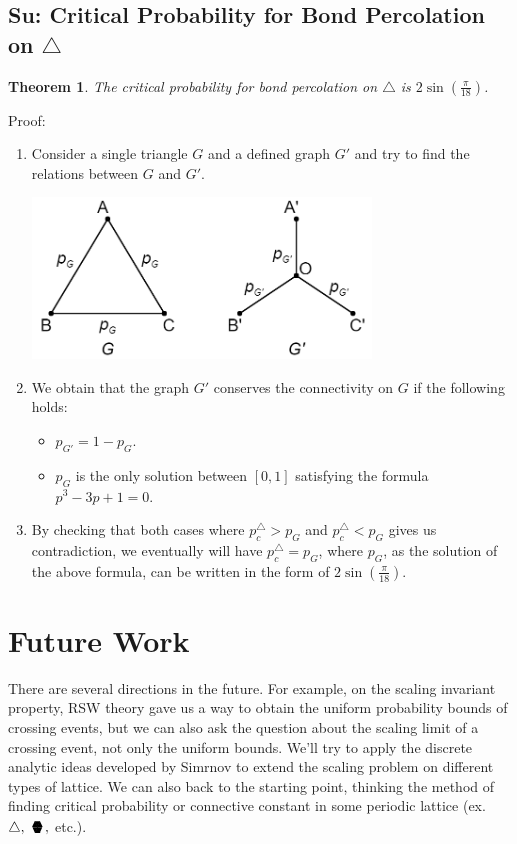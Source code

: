 \documentclass[12pt]{article}
\newcommand{\sixedge}{\mbox{\parbox[t][-2pt][c]{10pt}{\scriptsize$\blacktriangledown\hspace{-3.6pt}\blacktriangle\hspace{-4pt}\blacktriangledown$}\hspace{-10.2pt}\parbox[b][10.7pt][c]{10pt}{\scriptsize$\blacktriangle\hspace{-3.6pt}\blacktriangledown\hspace{-3.6pt}\blacktriangle$}}}
\theoremstyle{plane}
\newtheorem*{thm}{Theorem}
\theoremstyle{definition}
\begin{document}
\subsection*{Su: Critical Probability for Bond Percolation on $\triangle$}
\begin{thm}
The critical probability for bond percolation on $\triangle$ is $2\sin (\frac{\pi}{18})$.
\end{thm}
Proof:
\begin{enumerate}
	\item Consider a single triangle $G$ and a defined graph $G'$ and try to find the relations between $G$ and $G'$.
	\begin{center}
		\includegraphics[width=9cm]{./picture/try_an_goal.png}
	\end{center}
	\item We obtain that the graph $G'$ conserves the connectivity on $G$ if the following holds: 
		\begin{itemize}
			\item $p_{G'} = 1 - p_{G}$.
			\item $p_{G}$ is the only solution between $[0,1]$ satisfying the formula $p^3-3p+1=0$.
		\end{itemize}
	\item By checking that both cases where $p_{c}^{\triangle} > p_{G}$ and $p_{c}^{\triangle} < p_{G}$ gives us contradiction, we eventually will have $p_{c}^{\triangle} = p_{G}$, where $p_{G}$, as the solution of the above formula, can be written in the form of $2\sin(\frac{\pi}{18})$.
\end{enumerate}

\newpage
\section{Future Work}

There are several directions in the future. For example, on the scaling invariant property, RSW theory gave us a way to obtain the uniform probability bounds of crossing events, but we can also ask the question about the scaling limit of a crossing event, not only the uniform bounds. We'll try to apply the discrete analytic ideas developed by Simrnov to extend the scaling problem on different types of lattice.
We can also back to the starting point, thinking the method of finding critical probability or connective constant in some periodic lattice (ex. $\triangle,\ \sixedge,$ etc.). 
\end{document}
